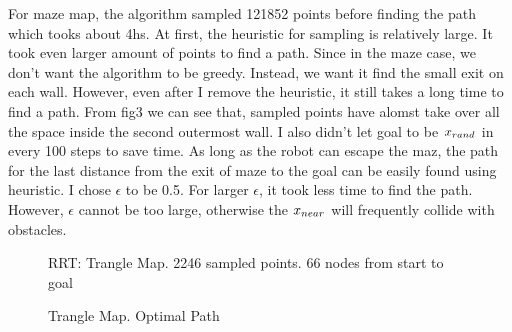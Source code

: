 \documentclass[letterpaper, 10 pt, conference]{ieeeconf}  %
\begin{document}
For maze map, the algorithm sampled 121852 points before finding the path which tooks about 4hs. At first, the heuristic for sampling
is relatively large. It took even larger amount of points to find a path. Since in the maze case, we don't want the algorithm to be 
greedy. Instead, we want it find the small exit on each wall. However, even after I remove the heuristic, it still takes a long time
to find a path. From fig3 we can see that, sampled points have alomst take over all the space inside the second outermost wall.
I also didn't let goal to be $x_{rand}$ in every 100 steps to save time. As long as the robot can escape the maz, the path for 
the last distance from the exit of maze to the goal can be easily found using heuristic. I chose $\epsilon$ to be 0.5. For 
larger $\epsilon$, it took less time to find the path. However, $\epsilon$ cannot be too large, otherwise the $x_{near}$ will frequently 
collide with obstacles. 

\begin{figure}[h]
    \centering
    \caption{RRT: Trangle Map. 2246 sampled points. 66 nodes from start to goal}
    \label{fig:map1}
 \end{figure}

 \begin{figure}[h]
    \centering
    \caption{Trangle Map. Optimal Path}
    \label{fig:map1}
 \end{figure}
\end{document}
